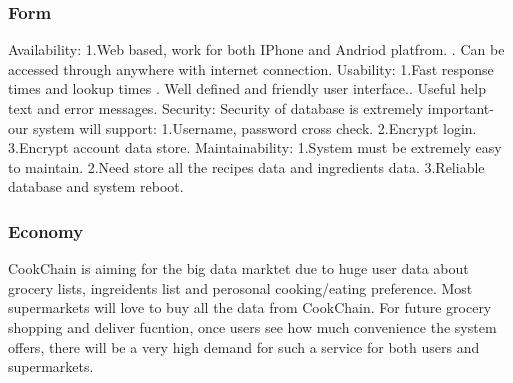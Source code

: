 \documentclass{article}
\begin{document}
\begin{table}[h]
\begin{tabular}{|l|l|}
\end{tabular}
\end{table}
\subsubsection{Form}
Availability: \newline
1.Web based, work for both IPhone and Andriod platfrom. . Can be accessed through anywhere with internet connection. \newline
Usability: \newline
1.Fast response times and lookup times . Well defined and friendly user interface.. Useful help text and error messages.\newline
Security:\newline
Security of database is extremely important- our system will support:\newline
1.Username, password cross check.\newline
2.Encrypt login.\newline
3.Encrypt account data store.\newline
Maintainability:\newline
1.System must be extremely easy to maintain. \newline
2.Need store all the recipes data and ingredients data. \newline
3.Reliable database and system reboot.
\subsubsection{Economy}
CookChain is aiming for the big data marktet due to huge user data about grocery lists, ingreidents list and perosonal cooking/eating preference. Most supermarkets will love to buy all the data from CookChain. For future grocery shopping and deliver fucntion, once users see how much convenience the system offers, there will be a very high demand for such a service for both users and supermarkets.
\end{document}
